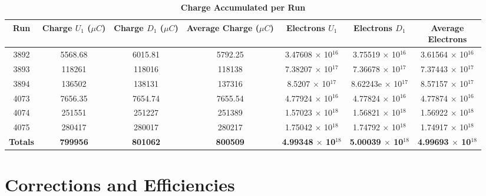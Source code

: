 \begin{table}[!h]
\centering
\begin{tabular}{|c c c c c c c|}
\hline
\textbf{Run} & \makecell{\textbf{Charge}\\ \textbf{$U_1$ ($\mu C$)}} & \makecell{\textbf{Charge}\\ \textbf{$D_1$ ($\mu C$)}} & \makecell{\textbf{Average}\\ \textbf{Charge}\\ ($\mu C$)} & \makecell{\textbf{Electrons} \\ $U_1$} & \makecell{\textbf{Electrons} \\ $D_1$} & \makecell{\textbf{Average} \\ \textbf{Electrons}}\\
\hline
3892 & 5568.68 & 6015.81 & 5792.25 & 3.47608 $\times$ 10$^{16}$ & 3.75519 $\times$ 10$^{16}$ & 3.61564 $\times$ 10$^{16}$ \\
3893 & 118261 & 118016 & 118138 & 7.38207 $\times$ 10$^{17}$ & 7.36678 $\times$ 10$^{17}$ & 7.37443 $\times$ 10$^{17}$ \\
3894 & 136502 & 138131 & 137316 & 8.5207 $\times$ 10$^{17}$ & 8.62243e $\times$ 10$^{17}$ & 8.57157 $\times$ 10$^{17}$ \\
4073 & 7656.35 & 7654.74 & 7655.54 & 4.77924 $\times$ 10$^{16}$ & 4.77824 $\times$ 10$^{16}$ & 4.77874 $\times$ 10$^{16}$ \\
4074 & 251551 & 251227 & 251389 & 1.57023 $\times$ 10$^{18}$ & 1.56821 $\times$ 10$^{18}$ & 1.56922 $\times$ 10$^{18}$ \\
4075 & 280417 & 280017 & 280217 & 1.75042 $\times$ 10$^{18}$ & 1.74792 $\times$ 10$^{18}$ & 1.74917 $\times$ 10$^{18}$ \\
\hline
\textbf{Totals} & \textbf{799956} & \textbf{801062} & \textbf{800509} & \textbf{4.99348 $\times$ 10$^{18}$} & \textbf{5.00039 $\times$ 10$^{18}$} & \textbf{4.99693 $\times$ 10$^{18}$} \\
\hline
\end{tabular}
\caption[Charge Accumulated per Run]{\bf{Charge Accumulated per Run}}
\label{tab:charges}
\end{table}

\section{Corrections and Efficiencies}
\label{sec:cor_eff}

